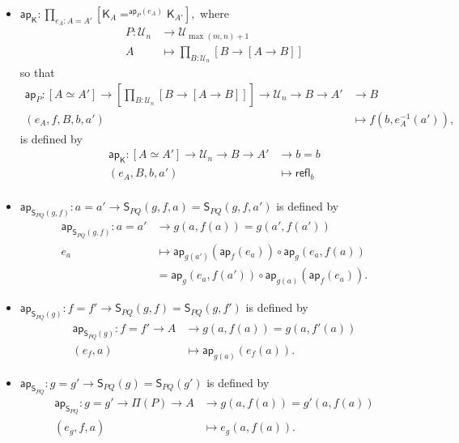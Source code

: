 \documentclass[a4paper]{article}
\theoremstyle{definition}
\theoremstyle{remark}
\let\defeq\equiv
\renewcommand{\equiv}{\simeq}
\newcommand{\pathOver}[1]{=^{#1}}
\newcommand{\univVar}{\mathcal}
\newcommand{\U}{\univVar{U}}
\newcommand{\0}{\primType{0}}
\newcommand{\1}{\primType{1}}
\newcommand{\2}{\primType{2}}
\newcommand{\nm}{\mathsf}
\newcommand{\refl}{\nm{refl}}
\newcommand{\ap}{\nm{ap}}
\newcommand{\combinator}{\nm}
\newcommand{\constFun}{\combinator{K}}
\newcommand{\revSubstFun}{\combinator{S}}
\newcommand{\rightInv}{\nm{rightInv}}
\begin{document}
\begin{itemize}
  \item $\ap_{\constFun} : \prod_{e_A : A = A'} [\constFun_A \pathOver{\ap_P(e_A)} \constFun_{A'}],$
  where
  \begin{align*}
    P : \U_n &\to     \U_{\max(m,n)+1}\\
        A    &\mapsto \prod_{B : \U_n} [B \to [A \to B]]
  \end{align*}
  so that
  \begin{align*}
    \ap_P : [A \equiv A'] \to \left[\prod_{B : \U_n} [B \to [A \to B]]\right] \to \U_n \to B \to A' &\to     B\\
            (e_A,f,B,b,a')                                                                          &\mapsto f(b,e_A^{-1}(a')),
  \end{align*}
  is defined by
  \begin{align*}
    \ap_{\constFun} : [A \equiv A'] \to \U_n \to B \to A' &\to     b = b\\
                      (e_A,B,b,a')                        &\mapsto \refl_b\\
  \end{align*}

  \item $\ap_{\revSubstFun_{PQ}(g,f)} : a = a' \to \revSubstFun_{PQ}(g,f,a) = \revSubstFun_{PQ}(g,f,a')$
  is defined by
  \begin{align*}
    \ap_{\revSubstFun_{PQ}(g,f)} : a = a' &\to     g(a,f(a)) = g(a',f(a'))\\
                                   e_a    &\mapsto \ap_{g(a')}(\ap_f(e_a)) \circ \ap_g(e_a,f(a))\\
                                          &=       \ap_g(e_a,f(a')) \circ \ap_{g(a)}(\ap_f(e_a)).
  \end{align*}

  \item $\ap_{\revSubstFun_{PQ}(g)} : f = f' \to \revSubstFun_{PQ}(g,f) = \revSubstFun_{PQ}(g,f')$
  is defined by
  \begin{align*}
    \ap_{\revSubstFun_{PQ}(g)} : f = f' \to A &\to     g(a,f(a)) = g(a,f'(a))\\
                                 (e_f,a)      &\mapsto \ap_{g(a)}(e_f(a)).
  \end{align*}

  \item $\ap_{\revSubstFun_{PQ}} : g = g' \to \revSubstFun_{PQ}(g) = \revSubstFun_{PQ}(g')$
  is defined by
  \begin{align*}
    \ap_{\revSubstFun_{PQ}} : g = g' \to \Pi(P) \to A &\to     g(a,f(a)) = g'(a,f(a))\\
                              (e_g,f,a)               &\mapsto e_g(a,f(a)).
  \end{align*}


\end{itemize}
\end{document}

